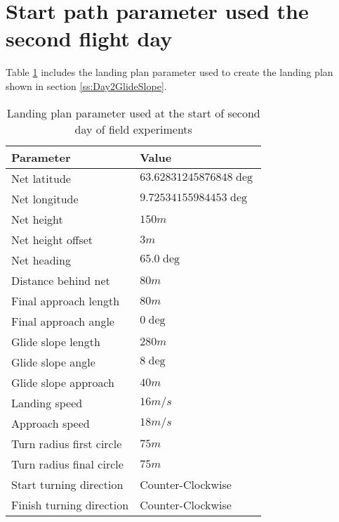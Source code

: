 \section{Start path parameter used the second flight day}\label{AP:SpecDay2}
Table \ref{AP:TB:landingDay2} includes the landing plan parameter used to create the landing plan shown in section \ref{ss:Day2GlideSlope}.
\begin{table}[H]
\centering
\begin{tabular}{| p{4cm} | p{4cm} |}
\hline
\textbf{Parameter}			& \textbf{Value}			\\ \hline
Net latitude				& $63.62831245876848 \deg$ 	\\ \hline
Net longitude				& $9.72534155984453 \deg$ 	\\ \hline
Net height					& $150 m$					\\ \hline
Net height offset			& $3 m$ 	\\ \hline
Net heading					& $65.0 \deg$				\\ \hline
Distance behind net			& $80 m$					\\ \hline
Final approach length		& $80 m$					\\ \hline
Final approach angle		& $0 \deg$					\\ \hline
Glide slope length			& $280 m $					\\ \hline
Glide slope angle			& $8 \deg$					\\ \hline
Glide slope approach		& $40 m$					\\ \hline
Landing speed				& $16 m/s$					\\ \hline
Approach speed				& $18 m/s$					\\ \hline
Turn radius first circle	& $75 m$					\\ \hline
Turn radius final circle	& $75 m$					\\ \hline
Start turning direction		& Counter-Clockwise			\\ \hline
Finish turning direction	& Counter-Clockwise			\\ \hline
\end{tabular}
\caption{Landing plan parameter used at the start of second day of field experiments}
\label{AP:TB:landingDay2}
\end{table}